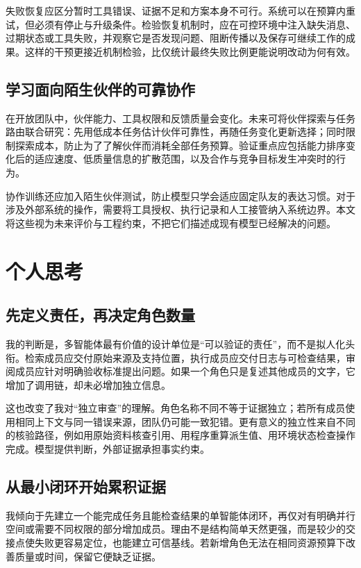 \documentclass[UTF8,a4paper,fontset=fandol,zihao=5,openany]{ctexrep}
\begin{document}
失败恢复应区分暂时工具错误、证据不足和方案本身不可行。系统可以在预算内重试，但必须有停止与升级条件。检验恢复机制时，应在可控环境中注入缺失消息、过期状态或工具失败，并观察它是否发现问题、阻断传播以及保存可继续工作的成果。这样的干预更接近机制检验，比仅统计最终失败比例更能说明改动为何有效。


\section{学习面向陌生伙伴的可靠协作}
在开放团队中，伙伴能力、工具权限和反馈质量会变化。未来可将伙伴探索与任务路由联合研究：先用低成本任务估计伙伴可靠性，再随任务变化更新选择；同时限制探索成本，防止为了了解伙伴而消耗全部任务预算。验证重点应包括能力排序变化后的适应速度、低质量信息的扩散范围，以及合作与竞争目标发生冲突时的行为。

协作训练还应加入陌生伙伴测试，防止模型只学会适应固定队友的表达习惯。对于涉及外部系统的操作，需要将工具授权、执行记录和人工接管纳入系统边界。本文将这些视为未来评价与工程约束，不把它们描述成现有模型已经解决的问题。


\chapter{个人思考}

\section{先定义责任，再决定角色数量}
我的判断是，多智能体最有价值的设计单位是“可以验证的责任”，而不是拟人化头衔。检索成员应交付原始来源及支持位置，执行成员应交付日志与可检查结果，审阅成员应针对明确验收标准提出问题。如果一个角色只是复述其他成员的文字，它增加了调用链，却未必增加独立信息。

这也改变了我对“独立审查”的理解。角色名称不同不等于证据独立；若所有成员使用相同上下文与同一错误来源，团队仍可能一致犯错。更有意义的独立性来自不同的核验路径，例如用原始资料核查引用、用程序重算派生值、用环境状态检查操作完成。模型提供判断，外部证据承担事实约束。


\section{从最小闭环开始累积证据}
我倾向于先建立一个能完成任务且能检查结果的单智能体闭环，再仅对有明确并行空间或需要不同权限的部分增加成员。理由不是结构简单天然更强，而是较少的交接点使失败更容易定位，也能建立可信基线。若新增角色无法在相同资源预算下改善质量或时间，保留它便缺乏证据。
\end{document}
